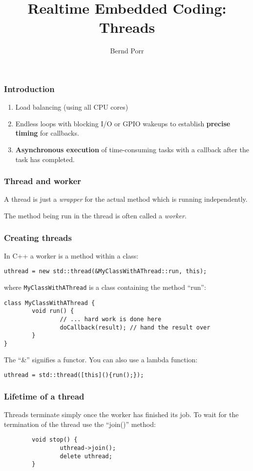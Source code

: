 \documentclass[xcolor=dvipsnames]{beamer}
\title{Realtime Embedded Coding: Threads}
\date{}
\author{Bernd Porr}
\begin{document}
\begin{frame}
\titlepage
\end{frame}

\begin{frame}[fragile]
\frametitle{Introduction}
\begin{enumerate}
\item Load balancing (using all CPU cores)
\item Endless loops with blocking I/O or GPIO wakeups
  to establish \textbf{precise timing} for callbacks.
\item \textbf{Asynchronous execution} of time-consuming tasks
  with a callback after the task has completed.
\end{enumerate}
\end{frame}


\begin{frame}[fragile]
\frametitle{Thread and worker}
A thread is just a \textsl{wrapper} for the actual method
which is running independently.

The method being run in the thread
is often called a \textsl{worker}.
\end{frame}


\begin{frame}[fragile]
\frametitle{Creating threads}
In C++ a worker is a method within
a class:
\begin{verbatim}
uthread = new std::thread(&MyClassWithAThread::run, this);
\end{verbatim}
where \texttt{MyClassWithAThread} is a class containing the method ``run'':
\begin{verbatim}
class MyClassWithAThread {
        void run() {
                // ... hard work is done here
                doCallback(result); // hand the result over
        }
}
\end{verbatim}
The ``\&'' signifies a functor. You can also use a lambda function:
\begin{verbatim}
uthread = std::thread([this](){run();});
\end{verbatim}
\end{frame}


\begin{frame}[fragile]
\frametitle{Lifetime of a thread}
Threads terminate simply once the worker has finished its job.
To wait for the termination
of the thread use the ``join()'' method:
\begin{verbatim}
        void stop() {
                uthread->join();
                delete uthread;
        }
\end{verbatim}
\end{frame}
\end{document}
